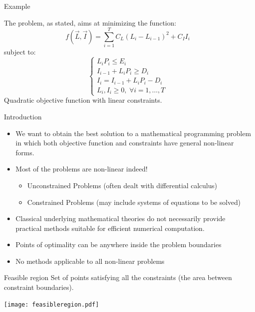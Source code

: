 \documentclass[c]{beamer}
\begin{document}
\begin{frame}{Example}

  The problem, as stated, aims at minimizing the function:
  \[f(\vec{L},\vec{I})=\sum_{i=1}^T C_L (L_i-L_{i-1})^2+C_I I_i\]
  subject to:
  \[
  \begin{cases}
    L_iP_i \leq E_i\\
    I_{i-1}+L_i P_i \geq D_i\\
    I_i = I_{i-1} + L_i P_i -D_i\\
    L_i,I_i \geq 0, \; \forall i=1,\ldots,T
  \end{cases}
  \]
  Quadratic objective function with linear constraints.

\end{frame}

\begin{frame}{Introduction}

\begin{itemize}
  \item We want to obtain the best solution to a mathematical programming problem in which both  objective function and constraints have general non-linear forms.

  \item Most of the problems are non-linear indeed!

  \begin{itemize}
    \item Unconstrained Problems (often dealt with differential calculus)
    \item Constrained Problems (may include systems of equations to be solved)
  \end{itemize}

  \item Classical underlying mathematical theories do not necessarily provide practical methods suitable for efficient numerical computation.

  \item Points of optimality can be anywhere inside the problem boundaries

  \item No methods applicable to all non-linear problems
\end{itemize}
\end{frame}

\begin{frame}

 \begin{block}{Feasible region}
   Set of points satisfying all the constraints (the area between constraint boundaries).
 \end{block}

 \begin{center}
  \texttt{[image: feasibleregion.pdf]}
 \end{center}

\end{frame}
\end{document}
